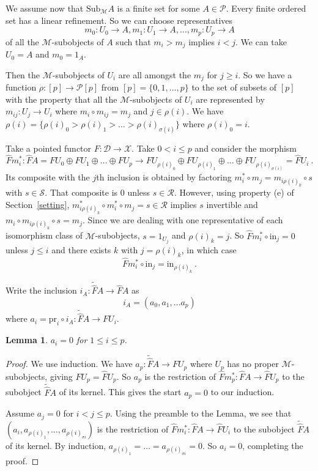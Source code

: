 \documentclass[a4paper,12pt,reqno]{amsart}
\newtheorem{lemma}[theorem]{Lemma}
\theoremstyle{definition}
\theoremstyle{fact}
\theoremstyle{genquest}
\theoremstyle{step}
\newcommand{\lra}{\longrightarrow}
\newcommand{\ra}{\rightarrow}
\def\CD{{\mathscr D}}
\def\CM{{\mathscr M}}
\def\CP{{\mathscr P}}
\def\CR{{\mathscr R}}
\def\CS{{\mathscr S}}
\def\CX{{\mathscr X}}
\begin{document}
We assume now that $\mathrm{Sub}_{\CM}A$ is a finite set for some $A\in \CP$.
Every finite ordered set has a linear refinement. So we can choose representatives
$$m_0:U_0\ra A, m_1:U_1\ra A, \dots ,m_p:U_p\ra A$$ of all the $\CM$-subobjects of $A$
such that $m_i > m_j$ implies $i<j$. We can take $U_0=A$ and $m_0=1_A$. 

Then the $\CM$-subobjects of $U_i$ are all amongst the $m_j$ for $j\ge i$. 
So we have a function $\rho : [p]\ra \mathcal{P}[p]$ from $[p] = \{0,1,\dots,p\}$
to the set of subsets of $[p]$ with the property that all the $\CM$-subobjects of $U_i$
are represented by $m_{ij} : U_j\ra U_i$ where $m_i\circ m_{ij} = m_j$ and $j\in \rho(i)$. 
We have $\rho(i) = \{\rho(i)_0 > \rho(i)_1 > \dots > \rho(i)_{\sigma(i)}\}$
where $\rho(i)_0=i$. 

Take a pointed functor $F:\CD \lra \CX$. Take $0< i\le p$ and consider the morphism
$$\widehat{F}m_i^* : \widehat{F}A=FU_0\oplus FU_1 \oplus \dots \oplus FU_p\lra FU_{\rho(i)_0}\oplus FU_{\rho(i)_1} \oplus \dots \oplus FU_{\rho(i)_{\sigma(i)}}= \widehat{F}U_i \ .$$
Its composite with the $j$th inclusion is obtained by factoring $m_i^*\circ m_j = m_{i \rho(i)_k}\circ s$ with $s\in \CS$. 
That composite is $0$ unless $s\in \CR$. However, using property (e) of 
Section~\ref{setting}, $m_{i \rho(i)_k}^*\circ m_i^*\circ m_j =  s \in \CR$ implies 
$s$ invertible and $m_i \circ m_{i \rho(i)_k} \circ s = m_j$.  
Since we are dealing with one representative of each isomorphism
class of $\CM$-subobjects, $s=1_{U_j}$ and $\rho(i)_k = j$.
So $\widehat{F}m_i^*\circ \mathrm{in}_j = 0$ unless $j\le i$ and there
exists $k$ with $j= \rho(i)_k$, in which case 
$$\widehat{F}m_i^*\circ \mathrm{in}_j = \mathrm{in}_{\rho(i)_k} \ .$$     

Write the inclusion $i_A : \widetilde{\widehat{F}}A \lra \widehat{F}A$ as
$$i_A = (a_0,a_1,\dots a_p)$$
where $a_i = \mathrm{pr}_i \circ i_A : \widetilde{\widehat{F}}A \lra FU_i$. 

\begin{lemma}\label{as=0} 
$a_i = 0$ for $1\le i \le p$.
\end{lemma} 
\begin{proof}
We use induction. We have $a_p : \widetilde{\widehat{F}}A \lra FU_p$
where $U_p$ has no proper $\CM$-subobjects, giving $FU_p = \widehat{F}U_p$. 
So $a_p$ is the restriction of $\widehat{F}m_p^*: \widehat{F}A \lra \widehat{F}U_p$
to the subobject $\widetilde{\widehat{F}}A$ of its kernel. This gives the start
$a_p = 0$ to our induction.

Assume $a_j = 0$ for $i < j \le p$. Using the preamble to the Lemma, we see
that $(a_i,a_{\rho(i)_1},\dots, a_{\rho(i)_{\sigma{i}}})$ is the restriction of
$\widehat{F}m_i^*: \widehat{F}A \lra \widehat{F}U_i$ to the subobject 
$\widetilde{\widehat{F}}A$ of its kernel. By induction, 
$a_{\rho(i)_1}=\dots= a_{\rho(i)_{\sigma{i}}}=0$. So $a_i = 0$,
completing the proof.    
\end{proof}
\end{document}
